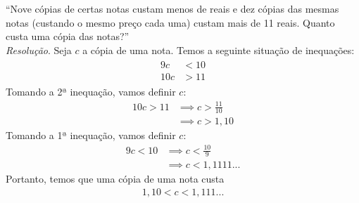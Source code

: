 \enquote{Nove cópias de certas notas custam menos de reais e dez cópias das mesmas notas (custando o mesmo preço cada uma) custam mais de 11 reais. Quanto custa uma cópia das notas?}
\\
\emph{Resolução}. Seja $c$ a cópia de uma nota. Temos a seguinte situação de inequações:
\begin{align*}
    \begin{array}{cc}
        9c &< 10 \\ 10c &> 11
    \end{array}
\end{align*}
Tomando a 2ª inequação, vamos definir $c$:
\begin{align*}
    10c > 11 & \implies c > \frac{11}{10} \\ & \implies c > 1,10
\end{align*}
Tomando a 1ª inequação, vamos definir $c$:
\begin{align*}
    9c < 10 & \implies c < \frac{10}{9} \\ & \implies c < 1,1111...
\end{align*}
Portanto, temos que uma cópia de uma nota custa
\begin{align*}
    1,10 < c < 1,111...
\end{align*}